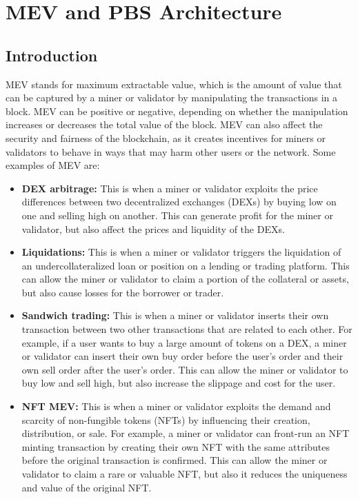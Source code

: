 \chapter{MEV and PBS Architecture}
\section{Introduction}
MEV stands for maximum extractable value, which is the amount of value that can be captured by a miner or validator by manipulating the transactions in a block. MEV can be positive or negative, depending on whether the manipulation increases or decreases the total value of the block. MEV can also affect the security and fairness of the blockchain, as it creates incentives for miners or validators to behave in ways that may harm other users or the network.
Some examples of MEV are:
\begin{itemize}
	\item \textbf{DEX arbitrage:} This is when a miner or validator exploits the price differences between two decentralized exchanges (DEXs) by buying low on one and selling high on another. This can generate profit for the miner or validator, but also affect the prices and liquidity of the DEXs.
	\item \textbf{Liquidations:} This is when a miner or validator triggers the liquidation of an undercollateralized loan or position on a lending or trading platform. This can allow the miner or validator to claim a portion of the collateral or assets, but also cause losses for the borrower or trader.
	\item \textbf{Sandwich trading:} This is when a miner or validator inserts their own transaction between two other transactions that are related to each other. For example, if a user wants to buy a large amount of tokens on a DEX, a miner or validator can insert their own buy order before the user’s order and their own sell order after the user’s order. This can allow the miner or validator to buy low and sell high, but also increase the slippage and cost for the user.
	\item \textbf{NFT MEV:} This is when a miner or validator exploits the demand and scarcity of non-fungible tokens (NFTs) by influencing their creation, distribution, or sale. For example, a miner or validator can front-run an NFT minting transaction by creating their own NFT with the same attributes before the original transaction is confirmed. This can allow the miner or validator to claim a rare or valuable NFT, but also it reduces the uniqueness and value of the original NFT.
\end{itemize}
